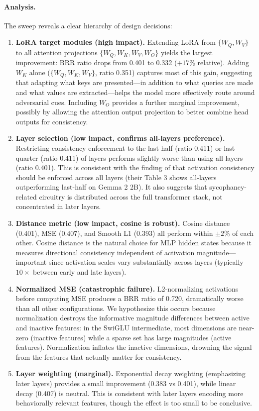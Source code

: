 \paragraph{Analysis.} The sweep reveals a clear hierarchy of design decisions:

\begin{enumerate}
    \item \textbf{LoRA target modules (high impact).} Extending LoRA from $\{W_Q, W_V\}$ to all attention projections $\{W_Q, W_K, W_V, W_O\}$ yields the largest improvement: BRR ratio drops from 0.401 to 0.332 ($+17$\% relative). Adding $W_K$ alone ($\{W_Q, W_K, W_V\}$, ratio 0.351) captures most of this gain, suggesting that adapting what keys are presented---in addition to what queries are made and what values are extracted---helps the model more effectively route around adversarial cues. Including $W_O$ provides a further marginal improvement, possibly by allowing the attention output projection to better combine head outputs for consistency.

    \item \textbf{Layer selection (low impact, confirms all-layers preference).} Restricting consistency enforcement to the last half (ratio 0.411) or last quarter (ratio 0.411) of layers performs slightly worse than using all layers (ratio 0.401). This is consistent with the finding of \citet{irpan2025consistency} that activation consistency should be enforced across all layers (their Table 3 shows all-layers outperforming last-half on Gemma 2 2B). It also suggests that sycophancy-related circuitry is distributed across the full transformer stack, not concentrated in later layers.

    \item \textbf{Distance metric (low impact, cosine is robust).} Cosine distance (0.401), MSE (0.407), and Smooth L1 (0.393) all perform within $\pm 2$\% of each other. Cosine distance is the natural choice for MLP hidden states because it measures directional consistency independent of activation magnitude---important since activation scales vary substantially across layers (typically $10 \times$ between early and late layers).

    \item \textbf{Normalized MSE (catastrophic failure).} L2-normalizing activations before computing MSE produces a BRR ratio of 0.720, dramatically worse than all other configurations. We hypothesize this occurs because normalization destroys the informative magnitude differences between active and inactive features: in the SwiGLU intermediate, most dimensions are near-zero (inactive features) while a sparse set has large magnitudes (active features). Normalization inflates the inactive dimensions, drowning the signal from the features that actually matter for consistency.

    \item \textbf{Layer weighting (marginal).} Exponential decay weighting (emphasizing later layers) provides a small improvement (0.383 vs 0.401), while linear decay (0.407) is neutral. This is consistent with later layers encoding more behaviorally relevant features, though the effect is too small to be conclusive.
\end{enumerate}

